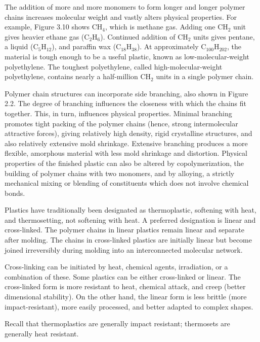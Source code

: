 \documentclass[
10pt,
a4paper,
openany,
svgnames,
]{book}
\begin{document}
The addition of more and more monomers to form longer and longer polymer chains increases molecular weight and vastly alters physical properties. For example, Figure 3.10 shows $\text{CH}_4$, which is methane gas. Adding one $\text{CH}_2$ unit gives heavier ethane gas (C$_2$H$_6$). Continued addition of $\text{CH}_2$ units gives pentane, a liquid ($\text{C}_5\text{H}_{12}$), and paraffin wax ($\text{C}_{18}\text{H}_{38}$). At approximately $\text{C}_{100}\text{H}_{202}$, the material is tough enough to be a useful plastic, known as low-molecular-weight polyethylene. The toughest polyethylene, called high-molecular-weight polyethylene, contains nearly a half-million $\text{CH}_2$ units in a single polymer chain.

Polymer chain structures can incorporate side branching, also shown in Figure 2.2. The degree of branching influences the closeness with which the chains fit together. This, in turn, influences physical properties. Minimal branching promotes tight packing of the polymer chains (hence, strong intermolecular attractive forces), giving relatively high density, rigid crystalline structures, and also relatively extensive mold shrinkage. Extensive branching produces a more flexible, amorphous material with less mold shrinkage and distortion. Physical properties of the finished plastic can also be altered by copolymerization, the building of polymer chains with two monomers, and by alloying, a strictly mechanical mixing or blending of constituents which does not involve chemical bonds. 
 
Plastics have traditionally been designated as thermoplastic, softening with heat, and thermosetting, not softening with heat. A preferred designation is linear and cross-linked. The polymer chains in linear plastics remain linear and separate after molding. The chains in cross-linked plastics are initially linear but become joined irreversibly during molding into an interconnected molecular network.

Cross-linking can be initiated by heat, chemical agents, irradiation, or a combination of these. Some plastics can be either cross-linked or linear. The cross-linked form is more resistant to heat, chemical attack, and creep (better dimensional stability). On the other hand, the linear form is less brittle (more impact-resistant), more easily processed, and better adapted to complex shapes.

Recall that thermoplastics are generally impact resistant; thermosets are generally heat resistant.
\end{document}
